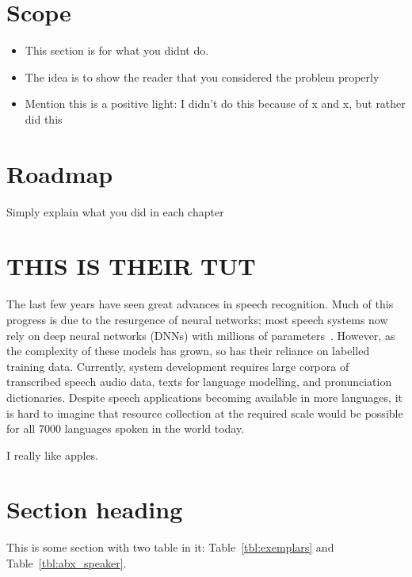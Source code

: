 \section{Scope}

\begin{itemize}
    \item This section is for what you didnt do.
    \item The idea is to show the reader that you considered the problem properly
    \item Mention this is a positive light: I didn't do this because of x and x, but rather did this
\end{itemize}

\section{Roadmap}

Simply explain what you did in each chapter






\newpage

\section{THIS IS THEIR TUT}


The last few years have seen great advances in speech recognition. Much of this progress is due to the resurgence of neural networks; most speech systems now rely on deep neural networks (DNNs) with millions of parameters~\cite{hinton+etal_spm2012}.
However, as the complexity of these models has grown, so has their reliance on labelled training data. Currently, system development requires large corpora of transcribed speech audio data, texts for language modelling, and pronunciation dictionaries.
Despite speech applications becoming available in more languages, it is hard to imagine that resource collection at the required scale would be possible for all 7000 languages spoken in the world today.

I really like apples.

\section{Section heading}

This is some section with two table in it: Table~\ref{tbl:exemplars} and Table~\ref{tbl:abx_speaker}.

